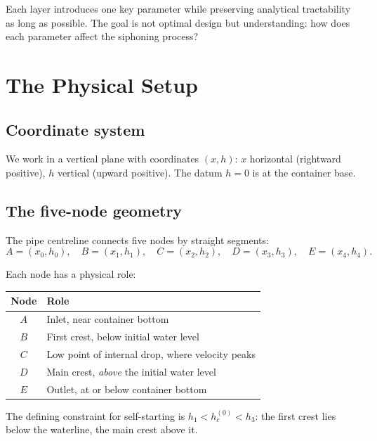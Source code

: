\documentclass[11pt]{article}
\begin{document}
Each layer introduces one key parameter while preserving analytical tractability as long as possible. The goal is not optimal design but understanding: how does each parameter affect the siphoning process?

\section{The Physical Setup}
\label{sec:setup}

\subsection{Coordinate system}

We work in a vertical plane with coordinates $(x, h)$: $x$ horizontal (rightward positive), $h$ vertical (upward positive). The datum $h = 0$ is at the container base.

\subsection{The five-node geometry}

The pipe centreline connects five nodes by straight segments:
\[
  A = (x_0, h_0), \quad B = (x_1, h_1), \quad C = (x_2, h_2), \quad D = (x_3, h_3), \quad E = (x_4, h_4).
\]

Each node has a physical role:
\begin{center}
\renewcommand{\arraystretch}{1.2}
\begin{tabular}{cl}
\toprule
Node & Role \\
\midrule
$A$ & Inlet, near container bottom \\
$B$ & First crest, below initial water level \\
$C$ & Low point of internal drop, where velocity peaks \\
$D$ & Main crest, \emph{above} the initial water level \\
$E$ & Outlet, at or below container bottom \\
\bottomrule
\end{tabular}
\end{center}

The defining constraint for self-starting is $h_1 < h_c^{(0)} < h_3$: the first crest lies below the waterline, the main crest above it.
\end{document}
